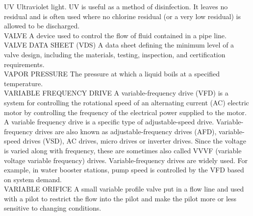 \documentclass{article}
\begin{document}
UV
Ultraviolet light. UV is useful as a method of disinfection. It leaves no residual and is often used where no chlorine residual (or a very low residual) is allowed to be discharged.
\vspace{0.3cm}\\
VALVE
A device used to control the flow of fluid contained in a pipe line.
\vspace{0.3cm}\\
VALVE DATA SHEET (VDS)
A data sheet defining the minimum level of a valve design, including the materials, testing, inspection, and certification requirements.
\vspace{0.3cm}\\
VAPOR PRESSURE
The pressure at which a liquid boils at a specified temperature.
\vspace{0.3cm}\\
VARIABLE FREQUENCY DRIVE
A variable-frequency drive (VFD) is a system for controlling the rotational speed of an alternating current (AC) electric motor by controlling the frequency of the electrical power supplied to the motor. A variable frequency drive is a specific type of adjustable-speed drive. Variable-frequency drives are also known as adjustable-frequency drives (AFD), variable-speed drives (VSD), AC drives, micro drives or inverter drives. Since the voltage is varied along with frequency, these are sometimes also called VVVF (variable voltage variable frequency) drives. Variable-frequency drives are widely used. For example, in water booster stations, pump speed is controlled by the VFD based on system demand.
\vspace{0.3cm}\\
VARIABLE ORIFICE
A small variable profile valve put in a flow line and used with a pilot to restrict the flow into the pilot and make the pilot more or less sensitive to changing conditions.
\vspace{0.3cm}\\
\end{document}
